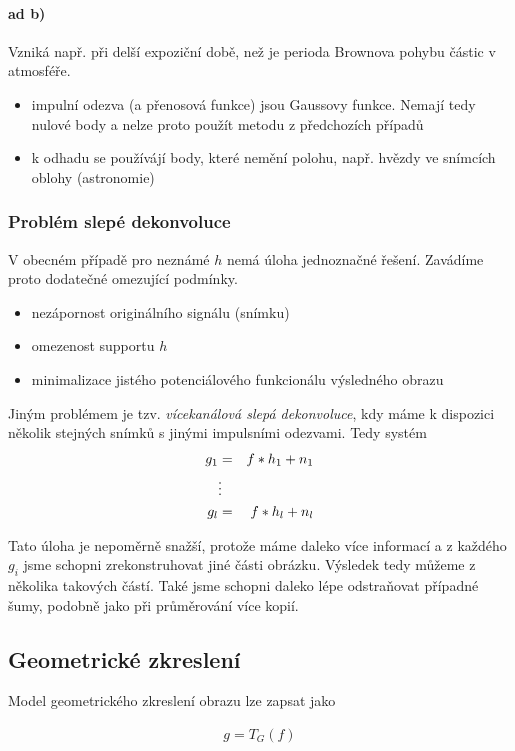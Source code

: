 \paragraph{ad b)} Vzniká např. při delší expoziční době, než je perioda Brownova pohybu částic v atmosféře. 
\begin{itemize}
\item impulní odezva (a přenosová funkce) jsou Gaussovy funkce. Nemají tedy nulové body a nelze proto použít metodu
z předchozích případů
\item k odhadu se používájí body, které nemění polohu, např. hvězdy ve snímcích oblohy (astronomie)
\end{itemize}

\subsubsection{Problém slepé dekonvoluce}
V obecném případě pro neznámé $h$ nemá úloha jednoznačné řešení. Zavádíme proto dodatečné omezující podmínky.

\begin{itemize}
\item nezápornost originálního signálu (snímku)
\item omezenost supportu $h$
\item minimalizace jistého potenciálového funkcionálu výsledného obrazu
\end{itemize}

Jiným problémem je tzv. {\em vícekanálová slepá dekonvoluce}, kdy máme k dispozici několik stejných snímků s jinými
impulsními odezvami. Tedy systém
\begin{eqnarray}
g_1&=&f\ast h_1+n_1\\
&\vdots&\nonumber\\
g_l&=&f\ast h_l+n_l
\end{eqnarray}

Tato úloha je nepoměrně snažší, protože máme daleko více informací a z každého $g_i$ jsme schopni zrekonstruhovat 
jiné části obrázku. Výsledek tedy můžeme  z několika takových částí. Také jsme schopni daleko lépe 
odstraňovat případné šumy, podobně jako při průměrování více kopií.

\subsection{Geometrické zkreslení}
Model geometrického zkreslení obrazu lze zapsat jako

\begin{eqnarray}
g=T_G(f)
\end{eqnarray}

